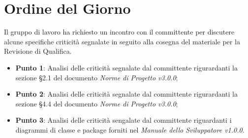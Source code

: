 \section{Ordine del Giorno}
Il gruppo di lavoro ha richiesto un incontro con il committente per discutere alcune specifiche criticità segnalate in seguito alla cosegna del materiale per la Revisione di Qualifica.
\begin{itemize}
	\item \textbf{Punto 1}: Analisi delle criticità segnalate dal committente rigurardanti la sezione §2.1 del documento \textit{Norme di Progetto v3.0.0};
	\item \textbf{Punto 2}: Analisi delle criticità segnalate dal committente rigurardanti la sezione §4.4 del documento \textit{Norme di Progetto v3.0.0};
	\item \textbf{Punto 3}: Analisi delle criticità sengalate dal committente riguardanti i diagrammi di classe e package forniti nel \textit{Manuale dello Sviluppatore v1.0.0}.
\end{itemize}